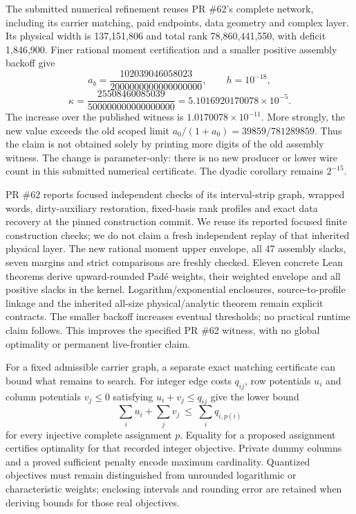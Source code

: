 \documentclass[11pt]{article}
\begin{document}
The submitted numerical refinement reuses PR \#62's complete network,
including its carrier matching, paid endpoints, data geometry and complex layer.
Its physical width is 137,151,806 and total rank 78,860,441,550, with deficit
1,846,900. Finer rational moment certification and a smaller positive
assembly backoff give
\[
 a_b=\frac{102039046058023}{2000000000000000000},\qquad h=10^{-18},
\]
\[
 \kappa=\frac{25508460085039}{500000000000000000}
       =5.1016920170078\times10^{-5}.
\]
The increase over the published witness is $1.0170078\times10^{-11}$.
More strongly, the new value exceeds the old scoped limit
$a_0/(1+a_0)=39859/781289859$. Thus the claim is not obtained
solely by printing more digits of the old assembly witness. The change is
parameter-only: there is no new producer or lower wire count in this
submitted numerical certificate. The dyadic corollary remains $2^{-15}$.

PR \#62 reports focused independent checks of its interval-strip graph, wrapped words,
dirty-auxiliary restoration, fixed-basis rank profiles and exact data recovery
at the pinned construction commit. We reuse its reported focused finite construction checks;
we do not claim a fresh independent replay of that inherited physical layer.
The new rational moment upper envelope, all 47 assembly slacks, seven margins
and strict comparisons are freshly checked. Eleven concrete Lean theorems
derive upward-rounded Pad\'e weights, their weighted envelope and all positive
slacks in the kernel. Logarithm/exponential enclosures, source-to-profile linkage
and the inherited all-size physical/analytic theorem remain explicit contracts.
The smaller backoff increases eventual thresholds; no practical runtime claim
follows. This improves the specified PR \#62 witness, with no global optimality
or permanent live-frontier claim.

For a fixed admissible carrier graph, a separate exact matching certificate
can bound what remains to search. For integer edge costs $q_{ij}$, row
potentials $u_i$ and column potentials $v_j\le0$ satisfying
$u_i+v_j\le q_{ij}$ give the lower bound
\[
 \sum_i u_i+\sum_j v_j\ \le\ \sum_i q_{i,p(i)}
\]
for every injective complete assignment $p$. Equality for a proposed
assignment certifies optimality for that recorded integer objective.
Private dummy columns and a proved sufficient penalty encode maximum
cardinality. Quantized objectives must remain distinguished from
unrounded logarithmic or characteristic weights; enclosing intervals and
rounding error are retained when deriving bounds for those real objectives.
\end{document}
